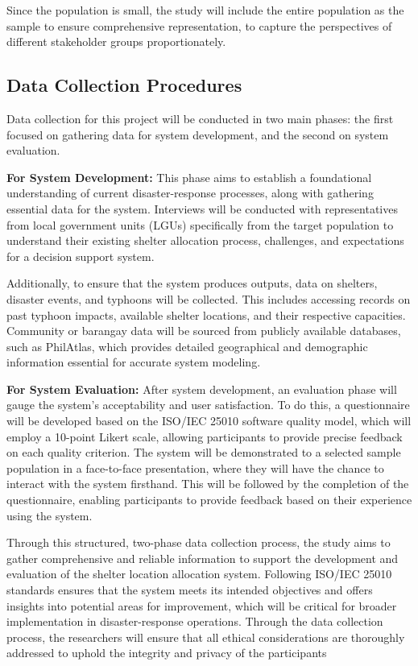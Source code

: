 Since the population is small, the study will include the entire population as the sample to ensure comprehensive representation, to capture the perspectives of different stakeholder groups proportionately.

\subsection{Data Collection Procedures}

Data collection for this project will be conducted in two main phases: the first focused on gathering data for system development, and the second on system evaluation.

\textbf{For System Development:} This phase aims to establish a foundational understanding of current disaster-response processes, along with gathering essential data for the system. Interviews will be conducted with representatives from local government units (LGUs) specifically from the target population to understand their existing shelter allocation process, challenges, and expectations for a decision support system. 

Additionally, to ensure that the system produces outputs, data on shelters, disaster events, and typhoons will be collected. This includes accessing records on past typhoon impacts, available shelter locations, and their respective capacities. Community or barangay data will be sourced from publicly available databases, such as PhilAtlas, which provides detailed geographical and demographic information essential for accurate system modeling.

\textbf{For System Evaluation:} After system development, an evaluation phase will gauge the system’s acceptability and user satisfaction. To do this, a questionnaire will be developed based on the ISO/IEC 25010 software quality model, which will employ a 10-point Likert scale, allowing participants to provide precise feedback on each quality criterion. The system will be demonstrated to a selected sample population in a face-to-face presentation, where they will have the chance to interact with the system firsthand. This will be followed by the completion of the questionnaire, enabling participants to provide feedback based on their experience using the system.

Through this structured, two-phase data collection process, the study aims to gather comprehensive and reliable information to support the development and evaluation of the shelter location allocation system. Following ISO/IEC 25010 standards ensures that the system meets its intended objectives and offers insights into potential areas for improvement, which will be critical for broader implementation in disaster-response operations. Through the data collection process, the researchers will ensure that all ethical considerations are thoroughly addressed to uphold the integrity and privacy of the participants

